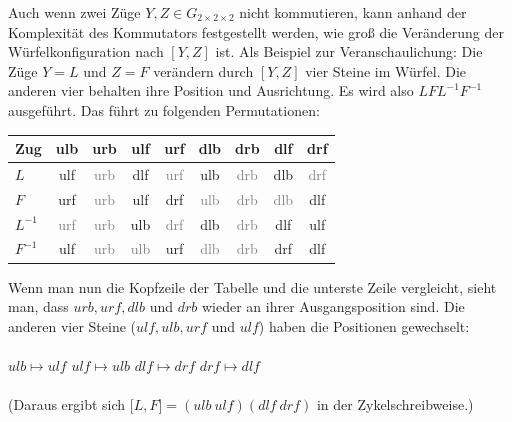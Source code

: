 \documentclass[12pt,a4paper, usenames, dvipsnames]{article}
\theoremstyle{mystyle}
\theoremstyle{definition}
\newcommand{\Gtwo}{\ensuremath{G_{2\times 2\times 2}}}
\begin{document}
Auch wenn zwei Züge $Y, Z \in \Gtwo$ nicht kommutieren, kann anhand der Komplexität des Kommutators festgestellt werden, wie groß die Veränderung der Würfelkonfiguration nach $[Y, Z]$ ist. 
Als Beispiel zur Veranschaulichung: Die Züge $Y=L$ und $Z=F$ verändern durch $[Y, Z]$ vier Steine im Würfel. Die anderen vier behalten ihre Position und Ausrichtung. 
Es wird also $LFL^{-1}F^{-1}$ ausgeführt. Das führt zu folgenden Permutationen:

\begin{center}
\begin{tabular}{lcccccccc}
\toprule
\textbf{Zug} & \textbf{ulb} & \textbf{urb} & \textbf{ulf} & \textbf{urf} & \textbf{dlb} & \textbf{drb} & \textbf{dlf} & \textbf{drf} \\

\midrule
$L$ & ulf & \textcolor{gray}{urb} & dlf & \textcolor{gray}{urf} & ulb & \textcolor{gray}{drb} & dlb & \textcolor{gray}{drf} \\

$F$ & urf & \textcolor{gray}{urb} & ulf &  drf & \textcolor{gray}{ulb} & \textcolor{gray}{drb} & \textcolor{gray}{dlb} & dlf \\

$L^{-1}$ & \textcolor{gray}{urf} & \textcolor{gray}{urb} & ulb & \textcolor{gray}{drf} & dlb & \textcolor{gray}{drb} & dlf & ulf \\

$F^{-1}$ \: & ulf & \textcolor{gray}{urb} & \textcolor{gray}{ulb} & urf & \textcolor{gray}{dlb} & \textcolor{gray}{drb} & drf & dlf\\
\bottomrule
\end{tabular}
\end{center}

Wenn man nun die Kopfzeile der Tabelle und die unterste Zeile vergleicht, sieht man, dass $urb, urf, dlb$ und $drb$ wieder an ihrer Ausgangsposition sind. Die anderen vier Steine ($ulf, ulb, urf$ und $ulf$) haben die Positionen gewechselt: \\
\\
$ulb \mapsto ulf$ \hspace*{2.5cm }$ulf  \mapsto ulb$ \hspace*{2.5cm } $dlf \mapsto drf$ \hspace*{2.5cm } $drf \mapsto dlf$
\\
\\
(Daraus ergibt sich $\lbrack L, F \rbrack  = (ulb \ ulf)(dlf \ drf)$ in der Zykelschreibweise.)

%
%
%
%
%
%
%
%
%
%
%
%
%
%
%
%
%
%
%
%
\end{document}
